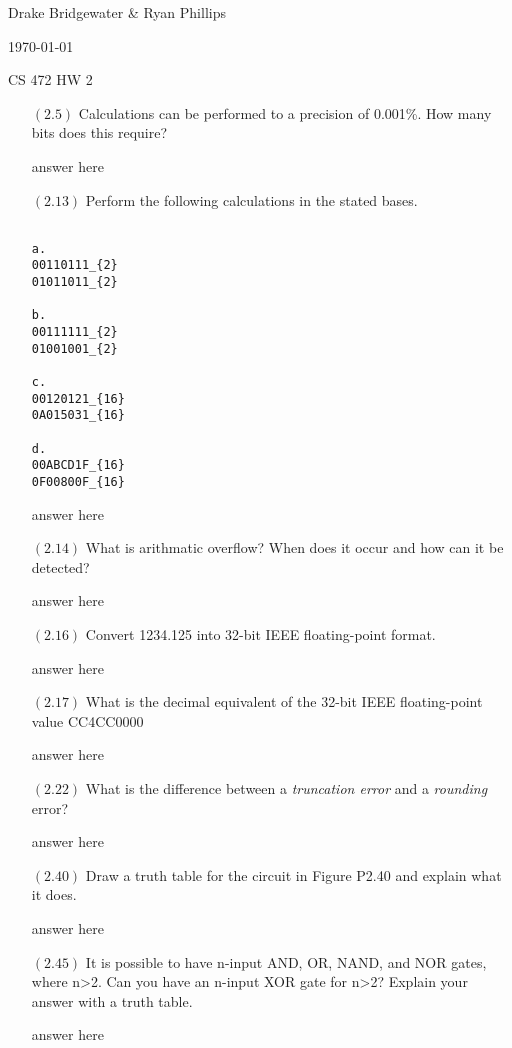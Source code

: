 \documentclass[letterpaper,12pt,titlepage]{article}
\def\name{Drake Bridgewater \& Ryan Phillips}
\begin{document}
\hfill \name

\hfill \today

\hfill CS 472 HW 2

\begin{enumerate}

\item[$(2.5)$] Calculations can be performed to a precision of 0.001\%. How many bits does this require?
  
answer here

\item[$(2.13)$] Perform the following calculations in the stated bases.

\begin{verbatim}

a.
00110111_{2}
01011011_{2}

b.
00111111_{2}
01001001_{2}

c.
00120121_{16}
0A015031_{16}

d.
00ABCD1F_{16}
0F00800F_{16}

\end{verbatim}
  
answer here

\item[$(2.14)$] What is arithmatic overflow? When does it occur and how can it be detected?
  
answer here

\item[$(2.16)$] Convert 1234.125 into 32-bit IEEE floating-point format.
  
answer here

\item[$(2.17)$] What is the decimal equivalent of the 32-bit IEEE floating-point value CC4CC0000
  
answer here

\item[$(2.22)$] What is the difference between a \textit{truncation error} and a \textit{rounding} error? 
  
answer here

\item[$(2.40)$] Draw a truth table for the circuit in Figure P2.40 and explain what it does.
  
answer here

\item[$(2.45)$] It is possible to have n-input AND, OR, NAND, and NOR gates, where n\textgreater 2. Can you have an n-input XOR gate for n\textgreater 2? Explain your answer with a truth table.
  
answer here

\end{enumerate}



\end{document}
